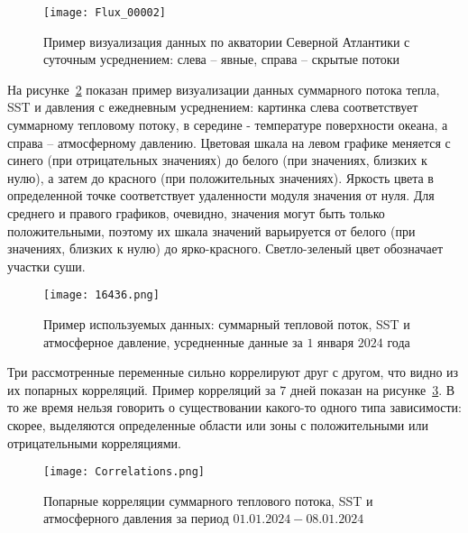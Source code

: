 \begin{figure}[!h]
	\centering
	\texttt{[image: Flux\_00002]}
	\caption{Пример визуализация данных по акватории Северной Атлантики с суточным усреднением: слева -- явные, справа -- скрытые потоки}
	\label{fig:flux_example}
\end{figure}


На рисунке~\ref{fig:data_example} показан пример визуализации данных суммарного потока тепла, SST и давления с ежедневным усреднением: картинка слева соответствует суммарному тепловому потоку, в середине - температуре поверхности океана, а справа -- атмосферному давлению. Цветовая шкала на левом графике меняется с синего (при отрицательных значениях) до белого (при значениях, близких к нулю), а затем до красного (при положительных значениях). Яркость цвета в определенной точке соответствует удаленности модуля значения от нуля. Для среднего и правого графиков, очевидно, значения могут быть только положительными, поэтому их шкала значений варьируется от белого (при значениях, близких к нулю) до ярко-красного. Светло-зеленый цвет обозначает участки суши.


\begin{figure}
	\centering
	\texttt{[image: 16436.png]}
	\caption{Пример используемых данных: суммарный тепловой поток, SST и атмосферное давление, усредненные данные за $1$ января $2024$ года}
	\label{fig:data_example}
\end{figure}

Три рассмотренные переменные сильно коррелируют друг с другом, что видно из их попарных корреляций. Пример корреляций за $7$ дней показан на рисунке~\ref{fig:correlations}. В то же время нельзя говорить о существовании какого-то одного типа зависимости: скорее, выделяются определенные области или зоны с положительными или отрицательными корреляциями.

\begin{figure}
	\centering
	\texttt{[image: Correlations.png]}
	\caption{Попарные корреляции суммарного теплового потока, SST и атмосферного давления за период $01.01.2024-08.01.2024$}
	\label{fig:correlations}
\end{figure}




